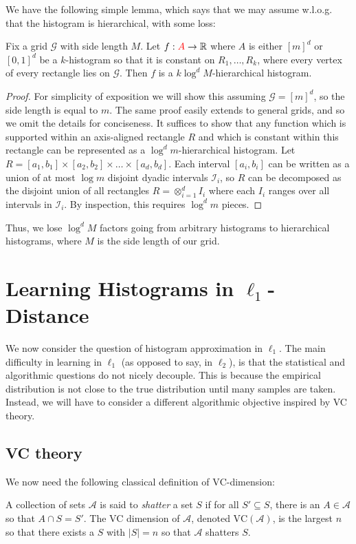 \documentclass[final,12pt]{colt2018} %
\newcommand{\calG}{\mathcal{G}}
\newcommand{\setI}{\mathcal{I}}
\newcommand{\VC}{\mathrm{VC}}
\newcommand{\A}{\mathcal{A}}
\newcommand{\new}[1]{{\color{red} #1}}
\newcommand{\new}[1]{{#1}}
\begin{document}
\noindent
We have the following simple lemma, which says that we may assume w.l.o.g. that the histogram is hierarchical, with some loss:
\begin{lemma}
\label{lem:arbitrary-to-hierarchical}
Fix a grid $\calG$ with side length $M$.
Let $f: \new{A} \to \R$ \new{where $A$ is either $[m]^d$ or $[0, 1]^d$} be a $k$-histogram so that it is constant on $R_1, \ldots, R_k$, 
where every vertex of every rectangle lies on $\calG$.
Then $f$ is a $k \log^d M$-hierarchical histogram.
\end{lemma}
\begin{proof}
For simplicity of exposition we will show this assuming $\calG = [m]^d$, so the side length is equal to $m$.
\new{The same proof easily extends to general grids, and so we omit the details for conciseness}.
It suffices to show that any function which is supported within an axis-aligned rectangle $R$ 
and which is constant within this rectangle can be represented as a $\log^d m$-hierarchical histogram.
Let $R = [a_1, b_1] \times [a_2, b_2] \times \ldots \times [a_d, b_d]$.
Each interval $[a_i, b_i]$ can be written as a union of at most $\log m$ 
disjoint dyadic intervals $\setI_i$, so $R$ can be decomposed 
as the disjoint union of all rectangles $R = \otimes_{i = 1}^d I_i$ where each $I_i$ ranges over all intervals in $\setI_i$.
By inspection, this requires $\log^d m$ pieces.
\end{proof}

\noindent Thus, we lose $\log^d M$ factors going 
from arbitrary histograms to hierarchical histograms, 
where $M$ is the side length of our grid.

\section{Learning Histograms in $\ell_1$-Distance}
\label{sec:l1}
We now consider the question of histogram approximation in $\ell_1$.
The main difficulty in learning in $\ell_1$ (as opposed to say, in $\ell_2$), is that the statistical and algorithmic questions do not nicely decouple.
This is because the empirical distribution is not close to the true distribution until many samples are taken.
Instead, we will have to consider a different algorithmic objective inspired by VC theory.

\subsection{VC theory}
We now need the following classical definition of $\VC$-dimension:
\begin{definition}[VC dimension]
A collection of sets $\A$ is said to \emph{shatter} a set $S$ if for all $S' \subseteq S$, there is an $A \in \A$ so that $A \cap S = S'$.
The VC dimension of $\A$, denoted $\VC(\A)$, is the largest $n$ so that there exists a $S$ with $|S| = n$ so that $\A$ shatters $S$.
\end{definition}
\end{document}
